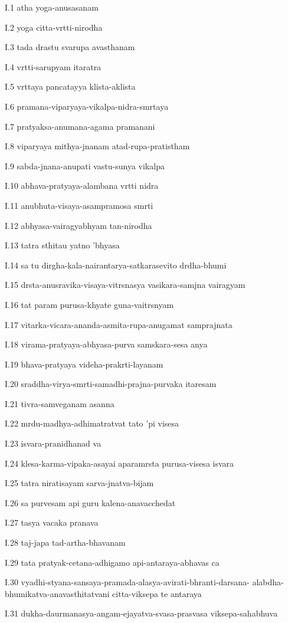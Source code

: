 I.1
atha yoga-anusasanam

I.2
yoga citta-vrtti-nirodha

I.3
tada drastu svarupa avasthanam

I.4
vrtti-sarupyam itaratra

I.5
vrttaya pancatayya klista-aklista

I.6
pramana-viparyaya-vikalpa-nidra-smrtaya

I.7
pratyaksa-anumana-agama pramanani

I.8
viparyaya mithya-jnanam atad-rupa-pratistham

I.9
sabda-jnana-anupati vastu-sunya vikalpa

I.10
abhava-pratyaya-alambana vrtti nidra

I.11
anubhuta-visaya-asampramosa smrti

I.12
abhyasa-vairagyabhyam tan-nirodha

I.13
tatra sthitau yatno 'bhyasa

I.14
sa tu dirgha-kala-nairantarya-satkarasevito drdha-bhumi

I.15
drsta-anusravika-visaya-vitrsnasya vasikara-samjna vairagyam

I.16
tat param purusa-khyate guna-vaitrsnyam

I.17
vitarka-vicara-ananda-asmita-rupa-anugamat samprajnata

I.18
virama-pratyaya-abhyasa-purva samskara-sesa anya

I.19
bhava-pratyaya videha-prakrti-layanam

I.20
sraddha-virya-smrti-samadhi-prajna-purvaka itaresam

I.21
tivra-samveganam asanna

I.22
mrdu-madhya-adhimatratvat tato 'pi visesa

I.23
isvara-pranidhanad va

I.24
klesa-karma-vipaka-asayai aparamrsta purusa-visesa isvara

I.25
tatra niratisayam sarva-jnatva-bijam

I.26
sa purvesam api guru kalena-anavacchedat

I.27
tasya vacaka pranava

I.28
taj-japa tad-artha-bhavanam

I.29
tata pratyak-cetana-adhigamo api-antaraya-abhavas ca

I.30
vyadhi-styana-sansaya-pramada-alasya-avirati-bhranti-darsana-
alabdha-bhumikatva-anavasthitatvani citta-viksepa te antaraya

I.31
dukha-daurmanasya-angam-ejayatva-svasa-prasvasa viksepa-sahabhuva


